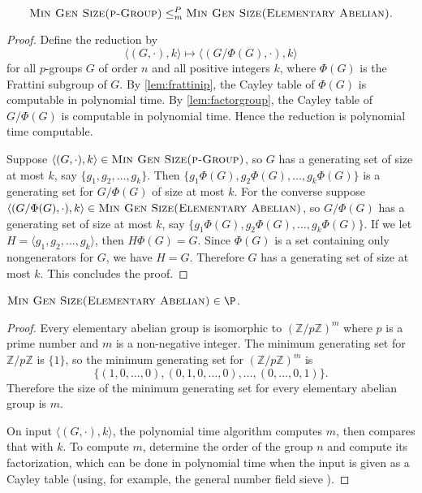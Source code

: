 \documentclass{article}
\newcommand{\gen}[1]{{\langle #1 \rangle}}
\begin{document}
\begin{proposition}
  \begin{equation*}
    \textsc{Min Gen Size(p-Group)} \leq_m^P \textsc{Min Gen Size(Elementary Abelian)}.
  \end{equation*}
\end{proposition}
\begin{proof}
  Define the reduction by
  \begin{equation*}
    \langle (G, \cdot), k \rangle \mapsto \langle (G / \Phi(G), \cdot), k \rangle
  \end{equation*}
  for all $p$-groups $G$ of order $n$ and all positive integers $k$, where $\Phi(G)$ is the Frattini subgroup of $G$.
  By \autoref{lem:frattinip}, the Cayley table of $\Phi(G)$ is computable in polynomial time.
  By \autoref{lem:factorgroup}, the Cayley table of $G / \Phi(G)$ is computable in polynomial time.
  Hence the reduction is polynomial time computable.

  Suppose $\langle (G, \cdot), k \rangle \in \textsc{Min Gen Size(p-Group)}$, so $G$ has a generating set of size at most $k$, say $\{g_1, g_2, \dotsc, g_k\}$.
  Then $\{g_1\Phi(G), g_2\Phi(G), \dotsc, g_k\Phi(G)\}$ is a generating set for $G / \Phi(G)$ of size at most $k$.
  For the converse suppose $\langle (G / \Phi(G), \cdot), k \rangle \in \textsc{Min Gen Size(Elementary Abelian)}$, so $G / \Phi(G)$ has a generating set of size at most $k$, say $\{g_1\Phi(G), g_2\Phi(G), \dotsc, g_k\Phi(G)\}$.
  If we let $H = \gen{g_1, g_2, \dotsc, g_k}$, then $H \Phi(G) = G$.
  Since $\Phi(G)$ is a set containing only nongenerators for $G$, we have $H = G$.
  Therefore $G$ has a generating set of size at most $k$.
  This concludes the proof.
\end{proof}

\begin{lemma}
  $\textsc{Min Gen Size(Elementary Abelian)} \in \P$.
\end{lemma}
\begin{proof}
  Every elementary abelian group is isomorphic to $(\mathbb{Z} / p\mathbb{Z})^m$ where $p$ is a prime number and $m$ is a non-negative integer.
  The minimum generating set for $\mathbb{Z} / p\mathbb{Z}$ is $\{1\}$, so the minimum generating set for $(\mathbb{Z} / p\mathbb{Z})^m$ is
  \[
  \{(1, 0, \dotsc, 0), (0, 1, 0, \dotsc, 0), \dotsc, (0, \dotsc, 0, 1)\}.
  \]
  Therefore the size of the minimum generating set for every elementary abelian group is $m$.

  On input $\langle (G, \cdot), k \rangle$, the polynomial time algorithm computes $m$, then compares that with $k$.
  To compute $m$, determine the order of the group $n$ and compute its factorization, which can be done in polynomial time when the input is given as a Cayley table (using, for example, the general number field sieve \cite{llmp93}).
\end{proof}
\end{document}
